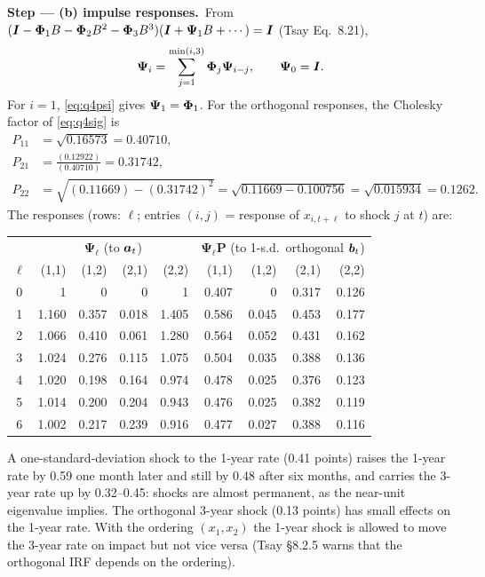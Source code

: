 \documentclass[11pt,a4paper]{article}
\newcommand{\passo}[2]{\par\smallskip\noindent\textbf{Step --- #1.}~#2}
\begin{document}
\begin{sol}
\passo{(b) impulse responses}{From $(\bm{I}-\bm{\Phi}_1B-\bm{\Phi}_2B^2-\bm{\Phi}_3B^3)(\bm{I}+\bm\Psi_1B+\cdots)=\bm{I}$ (Tsay Eq.~8.21),
\begin{equation}
\bm\Psi_i=\sum_{j=1}^{\min(i,3)}\bm{\Phi}_j\bm\Psi_{i-j},\qquad \bm\Psi_0=\bm{I}.\label{eq:q4psi}
\end{equation}
For $i=1$, \eqref{eq:q4psi} gives $\bm\Psi_1=\bm{\Phi}_1$. For the orthogonal responses, the Cholesky factor of
\eqref{eq:q4sig} is
\begin{align}
P_{11}&=\sqrt{0.16573}=0.40710,\nonumber\\
P_{21}&=\frac{(0.12922)}{(0.40710)}=0.31742,\nonumber\\
P_{22}&=\sqrt{(0.11669)-(0.31742)^2}=\sqrt{0.11669-0.100756}=\sqrt{0.015934}=0.1262.\nonumber
\end{align}
The responses (rows: $\ell$; entries $(i,j)$ = response of $x_{i,t+\ell}$ to shock $j$ at $t$) are:}
\begin{center}\small
\begin{tabular}{c|rrrr|rrrr}
\toprule
 & \multicolumn{4}{c|}{$\bm\Psi_\ell$ (to $\bm{a}_t$)} & \multicolumn{4}{c}{$\bm\Psi_\ell\bm P$ (to 1-s.d.\ orthogonal $\bm{b}_t$)}\\
$\ell$ & (1,1) & (1,2) & (2,1) & (2,2) & (1,1) & (1,2) & (2,1) & (2,2)\\
\midrule
0 & 1 & 0 & 0 & 1 & 0.407 & 0 & 0.317 & 0.126\\
1 & 1.160 & 0.357 & 0.018 & 1.405 & 0.586 & 0.045 & 0.453 & 0.177\\
2 & 1.066 & 0.410 & 0.061 & 1.280 & 0.564 & 0.052 & 0.431 & 0.162\\
3 & 1.024 & 0.276 & 0.115 & 1.075 & 0.504 & 0.035 & 0.388 & 0.136\\
4 & 1.020 & 0.198 & 0.164 & 0.974 & 0.478 & 0.025 & 0.376 & 0.123\\
5 & 1.014 & 0.200 & 0.204 & 0.943 & 0.476 & 0.025 & 0.382 & 0.119\\
6 & 1.002 & 0.217 & 0.239 & 0.916 & 0.477 & 0.027 & 0.388 & 0.116\\
\bottomrule
\end{tabular}
\end{center}
A one-standard-deviation shock to the 1-year rate (0.41 points) raises the 1-year rate by 0.59 one month
later and still by 0.48 after six months, and carries the 3-year rate up by 0.32--0.45: shocks are
almost permanent, as the near-unit eigenvalue implies. The orthogonal 3-year shock (0.13 points) has
small effects on the 1-year rate. With the ordering $(x_1,x_2)$ the 1-year shock is allowed to move the
3-year rate on impact but not vice versa (Tsay \S8.2.5 warns that the orthogonal IRF depends on the ordering).


\end{sol}
\end{document}
